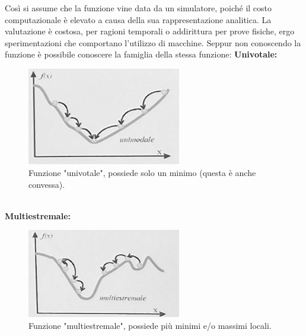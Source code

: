 \newpage
Così si assume che la funzione vine data da un simulatore, poiché il costo computazionale è elevato a causa della sua rappresentazione analitica.
La valutazione è costosa, per ragioni temporali o addirittura per prove fisiche, ergo sperimentazioni che comportano l'utilizzo di macchine.
\newline 
Seppur non conoscendo la funzione è possibile conoscere la famiglia della stessa funzione:
\newline
\textbf{Univotale:}
\begin{figure}[h!]
    \centering 
    \includegraphics[width=0.6\textwidth]{Esterni/Altro/imgs/t1.jpg} 
    \caption{Funzione "univotale", possiede solo un minimo (questa è anche convessa).} 
    \label{fig:type1} 
\end{figure}
\\
\textbf{Multiestremale:}
\begin{figure}[h!]
    \centering 
    \includegraphics[width=0.6\textwidth]{Esterni/Altro/imgs/t2.jpg} 
    \caption{Funzione "multiestremale", possiede più minimi e/o massimi locali.} 
    \label{fig:type2} 
\end{figure}

